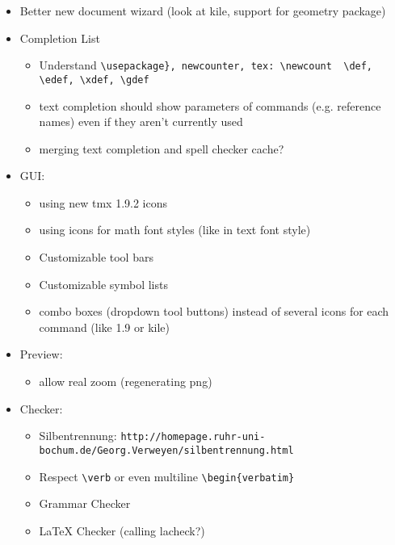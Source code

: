 \documentclass[10pt,a4paper,landscape]{report}
\begin{document}
\begin{itemize}
\begin{itemize}
		\item bib tex parser in own class
		\item with unit tests
		\item show SoundEx suggestion for wrong citatinos
		\item check environment paths (e.g. \verb+BIBINPUTS = C:\My Documents\CDMA\Papers\Bib;C:\My Documents\GPS\Papers\Bib+)
		\item references to all included files
	\end{itemize}
	\item Better new document wizard (look at kile, support for geometry package)
	\item Completion List \begin{itemize}
		\item Understand \verb+\usepackage}, newcounter, tex: \newcount  \def, \edef, \xdef, \gdef+
		\item text completion should show parameters of commands (e.g. reference names) even if they aren't currently used
		\item merging text completion and spell checker cache?
	\end{itemize}
	\item GUI: \begin{itemize}
		\item using new tmx 1.9.2 icons
		\item using icons for math font styles (like in text font style)
		\item Customizable tool bars
		\item Customizable symbol lists
		\item combo boxes (dropdown tool buttons) instead of several icons for each command (like 1.9 or kile)
	\end{itemize}
	\item Preview: \begin{itemize}
		\item allow real zoom (regenerating png)
	\end{itemize}
	\item  Checker: \begin{itemize}
		\item Silbentrennung: \verb+http://homepage.ruhr-uni-bochum.de/Georg.Verweyen/silbentrennung.html+
		\item Respect \verb+\verb+ or even multiline \verb+\begin{verbatim}+
		\item Grammar Checker
		\item LaTeX Checker	(calling lacheck?)

\end{itemize}
\end{itemize}
\end{document}
